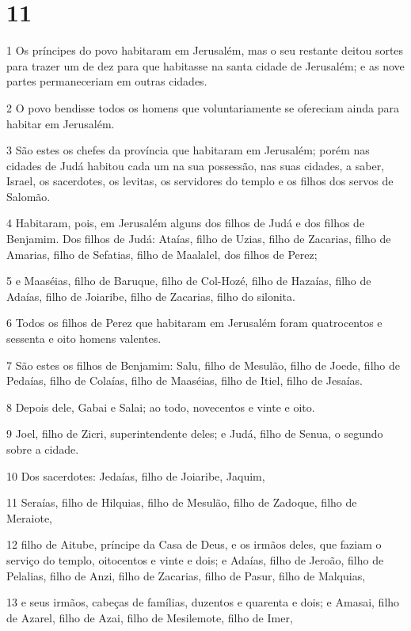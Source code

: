 \chapter{11}

\par 1 Os príncipes do povo habitaram em Jerusalém, mas o seu restante deitou sortes para trazer um de dez para que habitasse na santa cidade de Jerusalém; e as nove partes permaneceriam em outras cidades.
\par 2 O povo bendisse todos os homens que voluntariamente se ofereciam ainda para habitar em Jerusalém.
\par 3 São estes os chefes da província que habitaram em Jerusalém; porém nas cidades de Judá habitou cada um na sua possessão, nas suas cidades, a saber, Israel, os sacerdotes, os levitas, os servidores do templo e os filhos dos servos de Salomão.
\par 4 Habitaram, pois, em Jerusalém alguns dos filhos de Judá e dos filhos de Benjamim. Dos filhos de Judá: Ataías, filho de Uzias, filho de Zacarias, filho de Amarias, filho de Sefatias, filho de Maalalel, dos filhos de Perez;
\par 5 e Maaséias, filho de Baruque, filho de Col-Hozé, filho de Hazaías, filho de Adaías, filho de Joiaribe, filho de Zacarias, filho do silonita.
\par 6 Todos os filhos de Perez que habitaram em Jerusalém foram quatrocentos e sessenta e oito homens valentes.
\par 7 São estes os filhos de Benjamim: Salu, filho de Mesulão, filho de Joede, filho de Pedaías, filho de Colaías, filho de Maaséias, filho de Itiel, filho de Jesaías.
\par 8 Depois dele, Gabai e Salai; ao todo, novecentos e vinte e oito.
\par 9 Joel, filho de Zicri, superintendente deles; e Judá, filho de Senua, o segundo sobre a cidade.
\par 10 Dos sacerdotes: Jedaías, filho de Joiaribe, Jaquim,
\par 11 Seraías, filho de Hilquias, filho de Mesulão, filho de Zadoque, filho de Meraiote,
\par 12 filho de Aitube, príncipe da Casa de Deus, e os irmãos deles, que faziam o serviço do templo, oitocentos e vinte e dois; e Adaías, filho de Jeroão, filho de Pelalias, filho de Anzi, filho de Zacarias, filho de Pasur, filho de Malquias,
\par 13 e seus irmãos, cabeças de famílias, duzentos e quarenta e dois; e Amasai, filho de Azarel, filho de Azai, filho de Mesilemote, filho de Imer,

